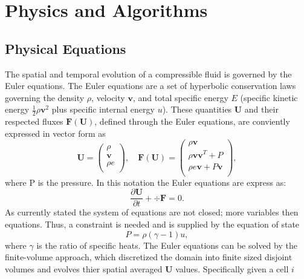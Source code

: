 \section{Physics and Algorithms}

\subsection{Physical Equations}
The spatial and temporal evolution of a compressible fluid is governed by the Euler equations.
The Euler equations are a set of hyperbolic conservation laws governing the density $\rho$,
velocity $\mathbf{v}$, and total specific energy $E$ (specific kinetic energy
$\frac{1}{2}\rho \mathbf{v}^2$ plus specific internal energy $u$). These quantities $\mathbf{U}$
and their respected fluxes $\mathbf{F}(\mathbf{U})$, defined through the Euler equations, are
conviently expressed in vector form as
%
\begin{equation}
    \mathbf{U} =
    \left(
    \begin{array}{c}
        \rho \\
        \mathbf{v} \\
        \rho e \\
    \end{array}
    \right),
    \quad
    \mathbf{F}(\mathbf{U}) =
    \left(
    \begin{array}{c}
        \rho\mathbf{v} \\
        \rho\mathbf{v}\mathbf{v}^T + P \\
        \rho e\mathbf{v} + P\mathbf{v} \\
    \end{array}
    \right),
\end{equation}
%
where P is the pressure. In this notation the Euler equations are express as:
%
\begin{equation}
    \frac{\partial \mathbf{U}}{\partial t} + \div \mathbf{F} = 0.
\end{equation}
%
As currently stated the system of equations are not closed; more variables then equations. Thus,
a constraint is needed and is supplied by the equation of state
%
\begin{equation}
    P = \rho(\gamma - 1)u,
\end{equation}
%
where $\gamma$ is the ratio of specific heats. The Euler equations can be solved by the 
finite-volume approach, which discretized the domain into finite sized disjoint volumes and
evolves thier spatial averaged $\mathbf{U}$ values. Specifically given a cell $i$


